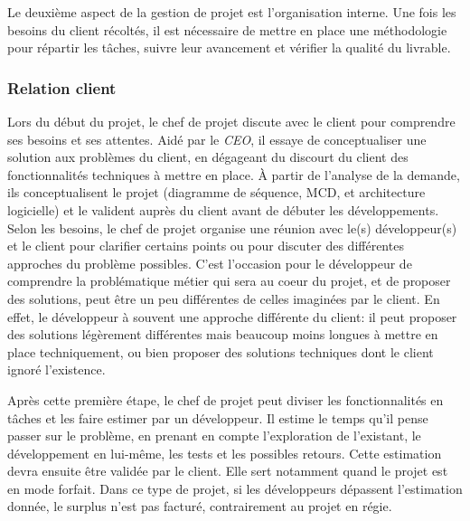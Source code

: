 \documentclass[12pt,a4paper]{article}
\begin{document}
  \bigskip

  Le deuxième aspect de la gestion de projet est l'organisation interne.
  Une fois les besoins du client récoltés, il est nécessaire de mettre en
  place une méthodologie pour répartir les tâches, suivre leur avancement
  et vérifier la qualité du livrable.

  \bigskip

  \subsubsection{Relation client}\label{relation-client}

  \bigskip

  Lors du début du projet, le chef de projet discute avec le client pour
  comprendre ses besoins et ses attentes. Aidé par le \emph{CEO}, il
  essaye de conceptualiser une solution aux problèmes du client, en
  dégageant du discourt du client des fonctionnalités techniques à mettre
  en place. À partir de l'analyse de la demande, ils conceptualisent le
  projet (diagramme de séquence, MCD, et architecture logicielle) et le
  valident auprès du client avant de débuter les développements. Selon les
  besoins, le chef de projet organise une réunion avec le(s)
  développeur(s) et le client pour clarifier certains points ou pour
  discuter des différentes approches du problème possibles. C'est
  l'occasion pour le développeur de comprendre la problématique métier qui
  sera au coeur du projet, et de proposer des solutions, peut être un peu
  différentes de celles imaginées par le client. En effet, le développeur
  à souvent une approche différente du client: il peut proposer des
  solutions légèrement différentes mais beaucoup moins longues à mettre en
  place techniquement, ou bien proposer des solutions techniques dont le
  client ignoré l'existence.

  \bigskip

  Après cette première étape, le chef de projet peut diviser les
  fonctionnalités en tâches et les faire estimer par un développeur. Il
  estime le temps qu'il pense passer sur le problème, en prenant en compte
  l'exploration de l'existant, le développement en lui-même, les tests et
  les possibles retours. Cette estimation devra ensuite être validée par
  le client. Elle sert notamment quand le projet est en mode forfait. Dans
  ce type de projet, si les développeurs dépassent l'estimation donnée, le
  surplus n'est pas facturé, contrairement au projet en régie.

  \bigskip
\end{document}
